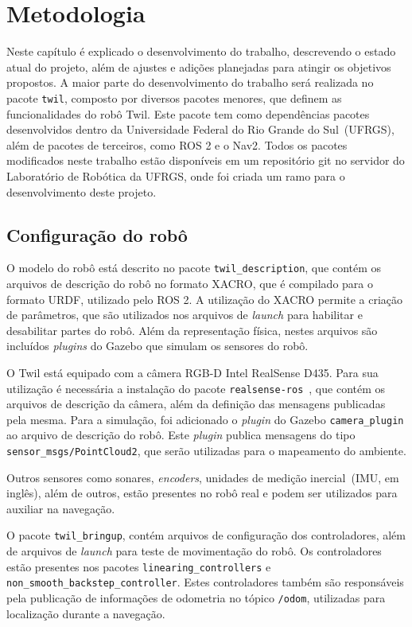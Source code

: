\documentclass[repeatfields,xlists,xpacks,oneside,yearsonly]{ufrgscca}
\begin{document}
\chapter{Metodologia}
\label{desenvolvimento}

Neste capítulo é explicado o desenvolvimento do trabalho, descrevendo o
estado atual do projeto, além de ajustes e adições planejadas para atingir
os objetivos propostos.
A maior parte do desenvolvimento do trabalho será realizada no pacote \texttt{twil},
composto por diversos pacotes menores, que definem as funcionalidades do robô Twil.
Este pacote tem como dependências pacotes desenvolvidos dentro da
Universidade Federal do Rio Grande do Sul~(UFRGS), além de pacotes de
terceiros, como ROS 2 e o Nav2.
Todos os pacotes modificados neste trabalho estão disponíveis em um repositório git
no servidor do Laboratório de Robótica da UFRGS, onde foi criada um
ramo para o desenvolvimento deste projeto.


\section{Configuração do robô}

O modelo do robô está descrito no pacote \texttt{twil\_description}, que contém
os arquivos de descrição do robô no formato XACRO, que é compilado para o formato
URDF, utilizado pelo ROS 2.
A utilização do XACRO permite a criação de parâmetros, que são utilizados nos
arquivos de \textit{launch} para habilitar e desabilitar partes do robô.
Além da representação física, nestes arquivos são incluídos \textit{plugins}
do Gazebo que simulam os sensores do robô.

O Twil está equipado com a câmera RGB-D Intel RealSense D435.
Para sua utilização é necessária a instalação do pacote
\texttt{realsense-ros}~\cite{realsense_ros}, que contém os arquivos de
descrição da câmera, além da definição das mensagens publicadas pela mesma.
Para a simulação, foi adicionado o \textit{plugin} do Gazebo
\texttt{camera\_plugin} ao arquivo de descrição do robô.
Este \textit{plugin} publica mensagens do tipo \texttt{sensor\_msgs/PointCloud2}, que
serão utilizadas para o mapeamento do ambiente.

Outros sensores como sonares, \textit{encoders},
unidades de medição inercial~(IMU, em inglês), além de outros, estão presentes no
robô real e podem ser utilizados para auxiliar na navegação.

O pacote \texttt{twil\_bringup}, contém arquivos de configuração dos
controladores, além de arquivos de \textit{launch} para teste de movimentação
do robô.
Os controladores estão presentes nos pacotes \texttt{linearing\_controllers} e
\texttt{non\_smooth\_backstep\_controller}.
Estes controladores também são responsáveis pela publicação de
informações de odometria no tópico \texttt{/odom}, utilizadas para localização
durante a navegação.
\end{document}
